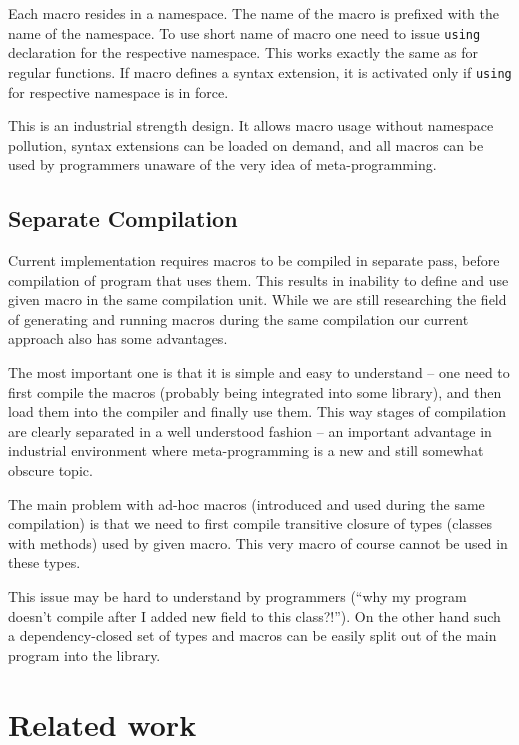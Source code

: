 \documentclass{llncs}
\begin{document}
Each macro resides in a namespace. The name of the macro is prefixed
with the name of the namespace. To use short name of macro one need
to issue \verb,using, declaration for the respective namespace. This
works exactly the same as for regular functions. If macro defines a
syntax extension, it is activated only if \verb,using, for respective
namespace is in force.

This is an industrial strength design. It allows macro usage without namespace
pollution, syntax extensions can be loaded on demand, and all macros
can be used by programmers unaware of the very idea of meta-programming.

\subsection{Separate Compilation}
Current implementation requires macros to be compiled in separate pass,
before compilation of program that uses them. This results in inability
to define and use given macro in the same compilation unit. While we
are still researching the field of generating and running macros during
the same compilation our current approach also has some advantages.

The most important one is that it is simple and easy to understand --
one need to first compile the macros (probably being integrated into
some library), and then load them into the compiler and finally use
them. This way stages of compilation are clearly separated in a well
understood fashion -- an important advantage in industrial environment
where meta-programming is a new and still somewhat obscure topic.

The main problem with ad-hoc macros (introduced and used during the
same compilation) is that we need to first compile transitive closure
of types (classes with methods) used by given macro. This very macro
of course cannot be used in these types.

This issue may be hard to understand by programmers (``why my program
doesn't compile after I added new field to this class?!''). On the
other hand such a dependency-closed set of types and macros can be
easily split out of the main program into the library.



\section{Related work}
\end{document}
